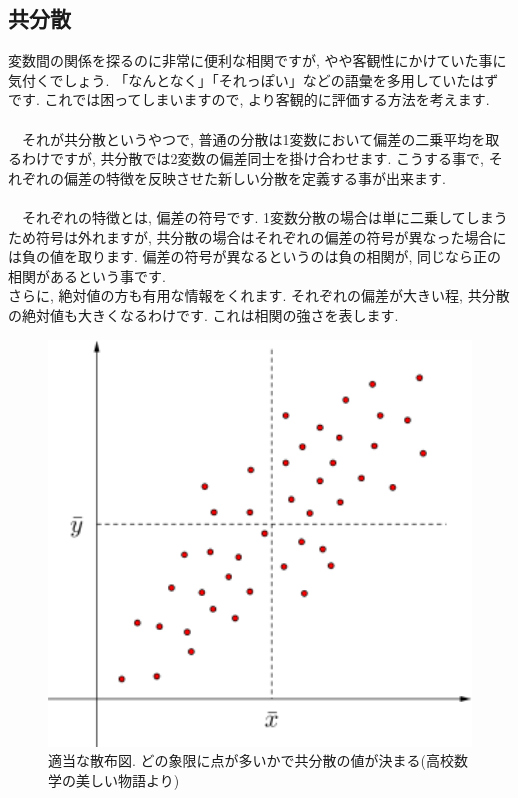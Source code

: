 \documentclass[11pt,a4paper]{jreport}
\begin{document}
\subsection{共分散}
変数間の関係を探るのに非常に便利な相関ですが, やや客観性にかけていた事に気付くでしょう. 「なんとなく」「それっぽい」などの語彙を多用していたはずです. これでは困ってしまいますので, より客観的に評価する方法を考えます.\\
\\
　それが共分散というやつで, 普通の分散は1変数において偏差の二乗平均を取るわけですが, 共分散では2変数の偏差同士を掛け合わせます. こうする事で, それぞれの偏差の特徴を反映させた新しい分散を定義する事が出来ます. \\
\\
　それぞれの特徴とは, 偏差の符号です. 1変数分散の場合は単に二乗してしまうため符号は外れますが, 共分散の場合はそれぞれの偏差の符号が異なった場合には負の値を取ります. 偏差の符号が異なるというのは負の相関が, 同じなら正の相関があるという事です.\\
さらに, 絶対値の方も有用な情報をくれます. それぞれの偏差が大きい程, 共分散の絶対値も大きくなるわけです. これは相関の強さを表します.\\

\begin{figure}[H]
\label{im:co-var}
  \centering
  \includegraphics[width=120mm,bb=0 0 432 288]{../figures/kyoubunnsann.png}
  \caption{適当な散布図. どの象限に点が多いかで共分散の値が決まる(高校数学の美しい物語より)}
\end{figure}
\end{document}
